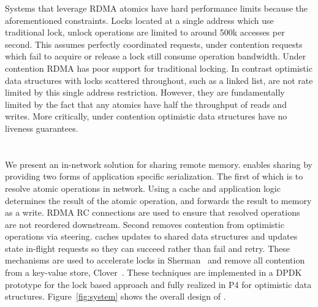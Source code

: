 Systems that leverage RDMA atomics have hard performance
limits because the aforementioned constraints.  Locks
located at a single address which use traditional lock,
unlock operations are limited to around 500k accesses per
second. This assumes perfectly coordinated requests, under
contention requests which fail to acquire or release a lock
still consume operation bandwidth.
Under contention RDMA has poor support for traditional
locking. In contrast optimistic data structures with locks
scattered throughout, such as a linked list, are not rate
limited by this single address restriction.  However, they
are fundamentally limited by the fact that any atomics have
half the throughput of reads and writes. More critically,
under contention optimistic data structures have no liveness
guarantees.





\section{\sword}

We present {\sword} an in-network solution for sharing
remote memory. {\sword} enables sharing by providing two
forms of application specific serialization. The first of
which is to resolve atomic operations in network. Using a
cache and application logic \sword determines the result of
the atomic operation, and forwards the result to memory as a
write. RDMA RC connections are used to ensure that resolved
operations are not reordered downstream.
%
Second {\sword} removes contention from optimistic
operations via steering. \sword caches updates to shared
data structures and updates state in-flight requests so they
can succeed rather than fail and retry.
These mechanisms are used to accelerate locks in
Sherman~\cite{sherman} and remove all contention from a
key-value store, Clover~\cite{clover}.
These techniques are implemented in a DPDK prototype for the
lock based approach and fully realized in P4 for optimistic
data structures. Figure~\ref{fig:system} shows the overall
design of {\sword}.


